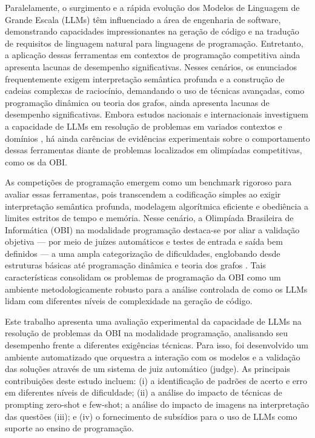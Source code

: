 \documentclass[12pt]{article}
\begin{document}
Paralelamente, o surgimento e a rápida evolução dos Modelos de Linguagem de Grande Escala (LLMs) têm influenciado a área de engenharia de software, demonstrando capacidades impressionantes na geração de código e na tradução de requisitos de linguagem natural para linguagens de programação. Entretanto, a aplicação dessas ferramentas em contextos de programação competitiva ainda apresenta lacunas de desempenho significativas. Nesses cenários, os enunciados frequentemente exigem interpretação semântica profunda e a construção de cadeias complexas de raciocínio, demandando o uso de técnicas avançadas, como programação dinâmica ou teoria dos grafos, ainda apresenta lacunas de desempenho significativas. Embora estudos nacionais e internacionais investiguem a capacidade de LLMs em resolução de problemas em variados contextos e domínios \cite{chen2021evaluating, mendonca2024evaluating, viegas2025assessing, huang2024competition, zheng2025livecodebench, li2024evaluating, almeida2023bluex}, há ainda carências de evidências experimentais sobre o comportamento dessas ferramentas diante de problemas localizados em olimpíadas competitivas, como os da OBI.

As competições de programação emergem como um benchmark rigoroso para avaliar essas ferramentas, pois transcendem a codificação simples ao exigir interpretação semântica profunda, modelagem algorítmica eficiente e obediência a limites estritos de tempo e memória. Nesse cenário, a Olimpíada Brasileira de Informática (OBI) na modalidade programação destaca-se por aliar a validação objetiva — por meio de juízes automáticos e testes de entrada e saída bem definidos — a uma ampla categorização de dificuldades, englobando desde estruturas básicas até programação dinâmica e teoria dos grafos \cite{obi2026}. Tais características consolidam os problemas de programação da OBI como um ambiente metodologicamente robusto para a análise controlada de como os LLMs lidam com diferentes níveis de complexidade na geração de código.

Este trabalho apresenta uma avaliação experimental da capacidade de LLMs na resolução de problemas da OBI na modalidade programação, analisando seu desempenho frente a diferentes exigências técnicas. Para isso, foi desenvolvido um ambiente automatizado que orquestra a interação com os modelos e a validação das soluções através de um sistema de juiz automático (judge). As principais contribuições deste estudo incluem: (i) a identificação de padrões de acerto e erro em diferentes níveis de dificuldade; (ii) a análise do impacto de técnicas de prompting zero-shot e few-shot; a análise do impacto de imagens na interpretação das questões (iii); e (iv) o fornecimento de subsídios para o uso de LLMs como suporte ao ensino de programação.
\end{document}
